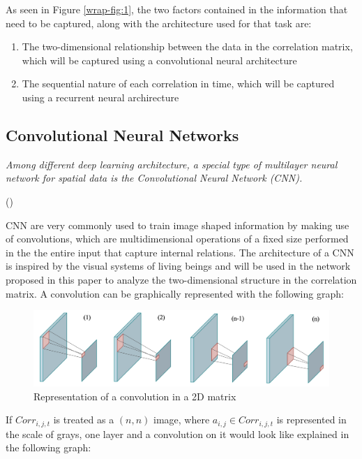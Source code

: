 \documentclass{article}
\begin{document}
As seen in Figure \ref{wrap-fig:1}, the two factors contained in the information that need to be captured, along with the architecture used for that task are:
\begin{enumerate}
    \item The two-dimensional relationship between the data in the correlation matrix, which will be captured using a convolutional neural architecture
    \item The sequential nature of each correlation in time, which will be captured using a recurrent neural archirecture
\end{enumerate}

\subsection{Convolutional Neural Networks}
\textit{Among different deep learning architecture, a special type of multilayer neural network for spatial data is the Convolutional Neural Network (CNN).}
\begin{flushright}\small
(\cite{ghosh2020fundamental})
\end{flushright}
CNN are very commonly used to train image shaped information by making use of convolutions, which are multidimensional operations of a fixed size performed in the the entire input that capture internal relations. The architecture of a CNN is inspired by the visual systems of living beings and will be used in the network proposed in this paper to analyze the two-dimensional structure in the correlation matrix. A convolution can be graphically represented with the following graph:
\begin{figure}[H]
\begin{center}
\includegraphics[width=0.75\linewidth]{Plots/Convo2.png}
\caption{Representation of a convolution in a 2D matrix}
\end{center}

\end{figure}
If $Corr_{i,j,t}$ is treated as a $(n,n)$ image, where $a_{i,j} \in Corr_{i,j,t}$ is represented in the scale of grays, one layer and a convolution on it would look like explained in the following graph: 
\end{document}
